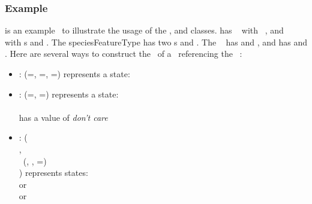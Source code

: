 \subsubsection{Example}
\label{def:SpeciesFeature:Example}

 is an example \speciesType\ to illustrate the usage of the \ListOfSpeciesFeatures, \SubListOfSpeciesFeatures and \SpeciesFeature classes.   has \speciesTypeInstance\  with \speciesFeatureType\ , and \speciesTypeInstance\  with \speciesFeatureType s  and . The speciesFeatureType  has two \possibleSpeciesFeatureValue s  and . The \speciesFeatureType\  has  and , and  has  and . Here are several ways to construct the \listOfSpeciesFeatures\ of a \species\ referencing the \speciesType\ :
\begin{itemize}
 \item 
    : \listOfSpeciesFeatures (=, =,  =) represents a state: \\ 
 \item 
     : \listOfSpeciesFeatures (=, =) represents a state:\\ 
     \\
     has a value of \emph{don't care}
 \item 
    : \listOfSpeciesFeatures (\\
   \parindent 20pt 
   \indent {},\\
   \indent \subListOfSpeciesFeatures\ (,  , =)\\
 ) represents states: \\ 
    or \\
    or \\
\end{itemize}

